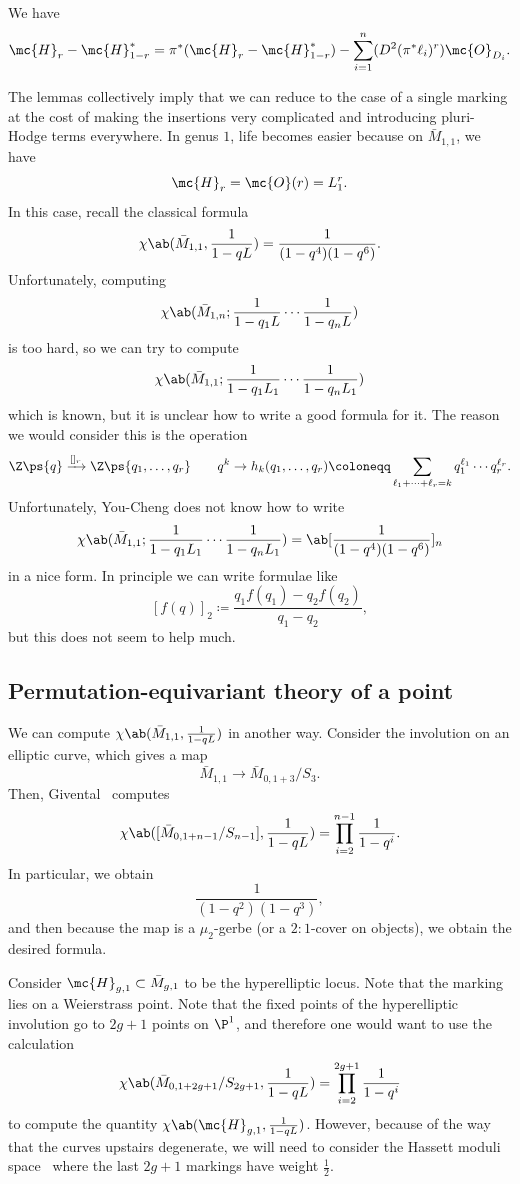 \begin{lem}
    We have
    \[ \mc{H}_r - \mc{H}_{1-r}^* = \pi^* (\mc{H}_r - \mc{H}_{1-r}^*) - \sum_{i=1}^n (D^2 (\pi^* \ell_i)^r) \mc{O}_{D_i}. \]
\end{lem}

The lemmas collectively imply that we can reduce to the case of a single marking at the cost of making the insertions very complicated and introducing pluri-Hodge terms everywhere. In genus \(1\), life becomes easier because on \(\bar{M}_{1,1}\), we have 
\[ \mc{H}_r = \mc{O}(r) = L_1^r. \]
In this case, recall the classical formula
\[ \chi\ab(\bar{M}_{1,1}, \frac{1}{1-qL}) = \frac{1}{(1-q^4)(1-q^6)}. \]
Unfortunately, computing
\[ \chi\ab(\bar{M}_{1,n}; \frac{1}{1-q_1 L} \cdots \frac{1}{1-q_n L}) \]
is too hard, so we can try to compute
\[ \chi\ab(\bar{M}_{1,1}; \frac{1}{1-q_1 L_1} \cdots \frac{1}{1-q_n L_1})  \]
which is known, but it is unclear how to write a good formula for it. The reason we would consider this is the operation
\[ \Z\ps{q} \xrightarrow{[]_r} \Z\ps{q_1, \ldots, q_r} \qquad q^k \to h_k(q_1, \ldots, q_r) \coloneqq \sum_{\ell_1 + \cdots + \ell_r = k} q_1^{\ell_1} \cdots q_r^{\ell_r}. \]
Unfortunately, You-Cheng does not know how to write
\[ \chi\ab(\bar{M}_{1,1}; \frac{1}{1-q_1 L_1} \cdots \frac{1}{1-q_n L_1}) = \ab[\frac{1}{(1-q^4)(1-q^6)}]_n \]
in a nice form. In principle we can write formulae like
\[ [f(q)]_2 \coloneqq \frac{q_1 f(q_1) - q_2 f(q_2)}{q_1 - q_2}, \]
but this does not seem to help much.

\subsection{Permutation-equivariant theory of a point}%
\label{sub:Permutation-equivariant theory of a point}

We can compute \(\chi\ab(\bar{M}_{1,1}, \frac{1}{1-q L})\) in another way. Consider the involution on an elliptic curve, which gives a map
\[ \bar{M}_{1,1} \to \bar{M}_{0,1+3}/S_3. \]
Then, Givental~\cite{Givental2017K1} computes
\[ \chi\ab([\bar{M}_{0,1+n-1}/S_{n-1}], \frac{1}{1-qL}) = \prod_{i=2}^{n-1} \frac{1}{1-q^i}. \]
In particular, we obtain
\[ \frac{1}{(1-q^2)(1-q^3)}, \]
and then because the map is a \(\mu_2\)-gerbe (or a \(2:1\)-cover on objects), we obtain the desired formula.

Consider \(\mc{H}_{g,1} \subset \bar{M}_{g,1}\) to be the hyperelliptic locus. Note that the marking lies on a Weierstrass point. Note that the fixed points of the hyperelliptic involution go to \(2g+1\) points on \(\P^1\), and therefore one would want to use the calculation
\[ \chi\ab(\bar{M}_{0,1+2g+1}/S_{2g+1}, \frac{1}{1-q L}) = \prod_{i=2}^{2g+1} \frac{1}{1-q^i} \]
to compute the quantity
\(\chi\ab(\mc{H}_{g,1}, \frac{1}{1-qL})\). However, because of the way that the curves upstairs degenerate, we will need to consider the Hassett moduli space~\cite{Hassett2003} where the last \(2g+1\) markings have weight \(\frac{1}{2}\).
 






